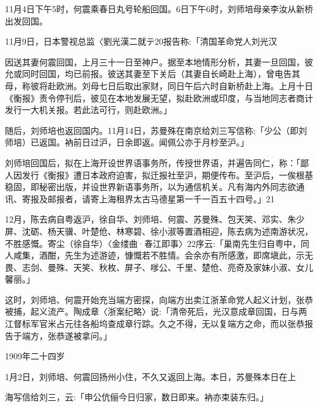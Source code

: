 11月4日下午5时，何震乘春日丸号轮船回国。6日下午6时，刘师培母亲李汝从新桥出发回国。

11月9日，日本警视总监〈劉光漢二就テ20报告称:「清国革命党人刘光汉

\vfill
\begin{BookNotes}
\end{BookNotes}

\noindent 因送其妻何震回国，上月三十一日至神户。据至本地情形分析，其妻一旦回国，彼允或同时回国，均已前报。彼送其妻至下关后（其妻自长崎赴上海），曾电告其母，称彼将赴欧洲。刘母七日后取出家财，同日午后六时自新桥赴上海。上月十日《衡报》责令停刊后，彼见在本地发展无望，拟赴欧洲或印度，与当地同志者商计发行一大机关报。若此法可行，则赴欧洲。」

随后，刘师培也返回国内。11月14日，苏曼殊在南京给刘三写信称:「少公（即刘师培）已返国。衲前日过沪，日余即返。闻佩公亦于月杪至沪。」

刘师培回国后，拟在上海开设世界语事务所，传授世界语，并遍告同仁，称：「鄙人因发行《衡报》遭日本政府迫害，拟迁报社至沪，期便传布。至沪后，一俟根基稳固，即秘密出版，并设世界新语事务所，以为通信机关。凡有海内外同志欲通讯、寄报及邮报者，请寄上海租界太古马德星第一千一百五十四号。」21

12月，陈去病自粤返沪，徐自华、刘师培、何震、苏曼殊、包天笑、邓实、朱少屏、沈砺、杨天骥、叶楚伧、林寒碧、徐小淑等置酒相迎，陈去病为述南游状况，不胜感慨。寄尘（徐自华）〈金缕曲·春江即事〉22序云:「巢南先生归自粤中，同人咸集，酒酣，先生为述游迹，慷慨若不胜情。会余亦有所感激，即席塡此，示无畏、志剑、曼殊、天笑、秋枚、屏子、嗲公、千里、楚伧、亮奇及家妹小淑、女儿馨丽。」

这时，刘师培、何震开始充当端方密探，向端方出卖江浙革命党人起义计划，张恭被捕，起义流产。陶成章〈浙案纪略〉说:「清帝死后，光汉意成章回国，日与两江督标军官米占元往各船坞查成章行踪。久之不得，无以复端方之命，而以张恭报告于端方，张恭遂被拿问。」

1909年二十四岁

1月2日，刘师培、何震回扬州小住，不久又返回上海。本日，苏曼殊本日在上

\vfill
\begin{BookNotes}
\end{BookNotes}

\noindent 海写信给刘三，云:「申公伉俪今日归家，数日即来。衲亦束装东归。」

